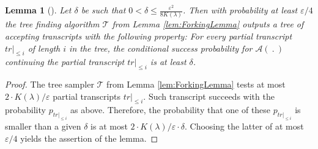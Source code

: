 \documentclass[10pt,article,oneside]{memoir}
\newtheorem{lem}[]{Lemma}
\theoremstyle{definition}
\theoremstyle{remark}
\begin{document}


\begin{lem}[\cite{HaloInfinite}]
\label{lem:ConditionalProbability}
Let $\delta$ be such that $0 < \delta \leq \frac{\varepsilon^2}{8 K(\lambda)}$.
Then with probability at least $\varepsilon/4$ the tree finding algorithm $\mathcal T$ from Lemma \ref{lem:ForkingLemma} outputs a tree of accepting transcripts with the following property: 
For every partial transcript $tr|_{\leq i}$ of length $i$ in the tree, the conditional success probability for $\mathcal A(\:.\:)$ continuing the partial transcript $tr|_{\leq i}$ is at least $\delta$.
\end{lem}
\begin{proof}
The tree sampler $\mathcal T$ from Lemma \ref{lem:ForkingLemma} tests at most $2\cdot K(\lambda)/\varepsilon$ partial transcripts $tr|_{\leq i}$. 
Such transcript succeeds with the probability $p_{tr|_{\leq i}}$ as above.
Therefore, the probability that one of these $p_{tr|_{\leq i}}$ is smaller than a given $\delta$ is at most $2\cdot K(\lambda)/\varepsilon \cdot\delta$.
Choosing the latter of at most $\varepsilon/4$ yields the assertion of the lemma.
\end{proof}
\end{document}

